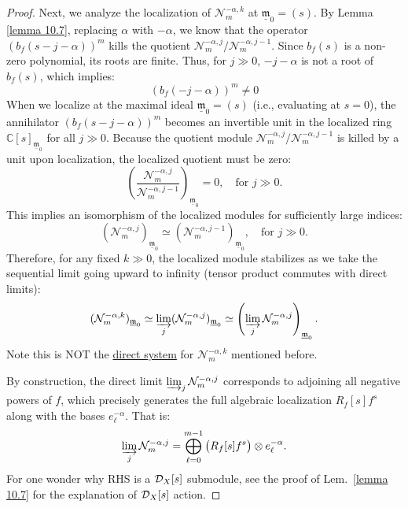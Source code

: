 \begin{proof}
    Next, we analyze the localization of $\mathcal{N}_m^{-\alpha,k}$ at $\underline{\mathfrak{m}}_0=(s)$.
    By Lemma \ref{lemma 10.7}, replacing $\alpha$ with $-\alpha$, we know that the operator $(b_f(s-j-\alpha))^m$ kills the quotient $\mathcal{N}_m^{-\alpha,j}\big/\mathcal{N}_m^{-\alpha,j-1}$.
    Since $b_f(s)$ is a non-zero polynomial, its roots are finite. Thus, for $j \gg 0$, $-j-\alpha$ is not a root of $b_f(s)$, which implies:
    \[
        (b_f(-j-\alpha))^m \neq 0
    \]
    When we localize at the maximal ideal $\underline{\mathfrak{m}}_0 = (s)$ (i.e., evaluating at $s=0$), the annihilator $(b_f(s-j-\alpha))^m$ becomes an invertible unit in the localized ring $\mathbb{C}[s]_{\underline{\mathfrak{m}}_0}$ for all $j \gg 0$.
    Because the quotient module $\mathcal{N}_m^{-\alpha,j}\big/\mathcal{N}_m^{-\alpha,j-1}$ is killed by a unit upon localization, the localized quotient must be zero:
    \[
        \left(\frac{\mathcal{N}_m^{-\alpha,j}}{\mathcal{N}_m^{-\alpha,j-1}}\right)_{\underline{\mathfrak{m}}_0} = 0, \quad \text{for } j \gg 0.
    \]
    This implies an isomorphism of the localized modules for sufficiently large indices:
    \[
        (\mathcal{N}_m^{-\alpha,j})_{\underline{\mathfrak{m}}_0} \simeq (\mathcal{N}_m^{-\alpha,j-1})_{\underline{\mathfrak{m}}_0}, \quad \text{for } j \gg 0.
    \]
    Therefore, for any fixed $k \gg 0$, the localized module stabilizes as we take the sequential limit going upward to infinity (tensor product commutes with direct limits):
    \[
        (\mathcal{N}_m^{-\alpha,k})_{\underline{\mathfrak{m}}_0} \simeq \varinjlim_{j} (\mathcal{N}_m^{-\alpha,j})_{\underline{\mathfrak{m}}_0} \simeq \left( \varinjlim_j \mathcal{N}_m^{-\alpha,j} \right)_{\underline{\mathfrak{m}}_0}.
    \]
    Note this is NOT the \hyperref[construction_of_direct_system_of_N_m_alpha_k]{direct system} for $\mathcal{N}_m^{-\alpha,k}$ mentioned before.

    By construction, the direct limit $\varinjlim_j \mathcal{N}_m^{-\alpha,j}$ corresponds to adjoining all negative powers of $f$, which precisely generates the full algebraic localization $R_f[s]f^s$ along with the bases $e_\ell^{-\alpha}$. That is:
    \[
        \varinjlim_{j} \mathcal{N}_m^{-\alpha,j} = \bigoplus_{\ell=0}^{m-1} \big(R_f[s]f^s\big) \otimes e_\ell^{-\alpha}.
    \]
    For one wonder why RHS is a $\mathcal{D}_X[s]$ submodule, see the proof of Lem.~\ref{lemma 10.7} for the explanation of $\mathcal{D}_X[s]$ action.


\end{proof}
